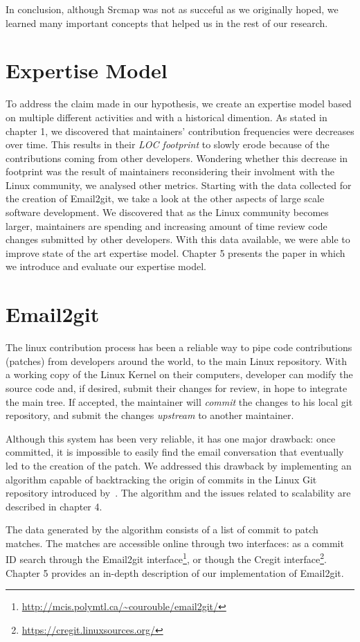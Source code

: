 In conclusion, although Srcmap was not as succeful as we originally hoped, we learned many important concepts that helped us in the rest of our research. 


\section{Expertise Model}
\label{sec:expertise_model}

To address the claim made in our hypothesis, we create an expertise model based on multiple different activities and with a historical dimention. As stated in chapter 1, we discovered that maintainers' contribution frequencies were decreases over time. This results in their \textit{LOC footprint} to slowly erode because of the contributions coming from other developers. Wondering whether this decrease in footprint was the result of maintainers reconsidering their involment with the Linux community, we analysed other metrics. Starting with the data collected for the creation of Email2git, we take a look at the other aspects of large scale software development. We discovered that as the Linux community becomes larger, maintainers are spending and increasing amount of time review code changes submitted by other developers. With this data available, we were able to improve state of the art expertise model. Chapter 5 presents the paper in which we introduce and evaluate our expertise model. 






\section{Email2git}
\label{sec:email2git}

The linux contribution process has been a reliable way to pipe code contributions (patches) from developers around the world, to the main Linux repository. With a working copy of the Linux Kernel on their computers, developer can modify the source code and, if desired, submit their changes for review, in hope to integrate the main tree. If accepted, the maintainer will \textit{commit} the changes to his local git repository, and submit the changes \textit{upstream} to another maintainer. 

Although this system has been very reliable, it has one major drawback: once committed, it is impossible to easily find the email conversation that eventually led to the creation of the patch. We addressed this drawback by implementing an algorithm capable of backtracking the origin of commits in the Linux Git repository introduced by~\citep{jiang14}. The algorithm and the issues related to scalability are described in chapter 4.

The data generated by the algorithm consists of a list of commit to patch matches. The matches are accessible online through two interfaces: as a commit ID search through the Email2git interface\footnote{\url{http://mcis.polymtl.ca/~courouble/email2git/}}, or though the Cregit interface\footnote{\url{https://cregit.linuxsources.org/}}. Chapter 5 provides an in-depth description of our implementation of Email2git.





